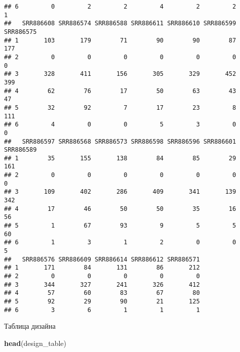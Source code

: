 \documentclass[
]{article}
\newenvironment{Shaded}{\begin{snugshade}}{\end{snugshade}}
\newcommand{\KeywordTok}[1]{\textcolor[rgb]{0.13,0.29,0.53}{\textbf{#1}}}
\newcommand{\NormalTok}[1]{#1}
\begin{document}
\begin{verbatim}
## 6         0         2         2         4         2         2         1
##   SRR886608 SRR886574 SRR886588 SRR886611 SRR886610 SRR886599 SRR886575
## 1       103       179        71        90        90        87       177
## 2         0         0         0         0         0         0         0
## 3       328       411       156       305       329       452       399
## 4        62        76        17        50        63        43        47
## 5        32        92         7        17        23         8       111
## 6         4         0         0         5         3         0         0
##   SRR886597 SRR886568 SRR886573 SRR886598 SRR886596 SRR886601 SRR886589
## 1        35       155       138        84        85        29       161
## 2         0         0         0         0         0         0         0
## 3       109       402       286       409       341       139       342
## 4        17        46        50        50        35        16        56
## 5         1        67        93         9         5         5        60
## 6         1         3         1         2         0         0         5
##   SRR886576 SRR886609 SRR886614 SRR886612 SRR886571
## 1       171        84       131        86       212
## 2         0         0         0         0         0
## 3       344       327       241       326       412
## 4        57        60        83        67        80
## 5        92        29        90        21       125
## 6         3         6         1         1         1
\end{verbatim}

Таблица дизайна

\begin{Shaded}
\begin{Highlighting}[]
\KeywordTok{head}\NormalTok{(design_table)}
\end{Highlighting}
\end{Shaded}
\end{document}
